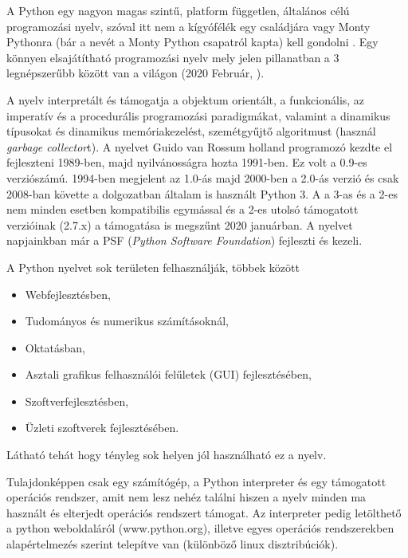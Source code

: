 

A Python egy nagyon magas szintű, platform független, általános célú
programozási nyelv, szóval itt nem a kígyófélék egy családjára vagy Monty
Pythonra (bár a nevét a Monty Python csapatról kapta) kell gondolni \cite{python}.
Egy könnyen elsajátítható programozási nyelv mely jelen pillanatban a 3
legnépszerűbb között van a világon (2020 Február, \cite{tiobe}).

A nyelv interpretált
és támogatja a objektum orientált, a funkcionális, az imperatív és a
procedurális programozási paradigmákat, valamint a dinamikus típusokat
és dinamikus memóriakezelést, szemétgyűjtő algoritmust (használ \emph{garbage collector}t). A
nyelvet Guido van Rossum holland programozó kezdte el fejleszteni
1989-ben, majd nyilvánosságra hozta 1991-ben. Ez volt a 0.9-es
verziószámú. 1994-ben megjelent az 1.0-ás majd 2000-ben a 2.0-ás verzió
és csak 2008-ban követte a dolgozatban általam is használt Python 3. A a
3-as és a 2-es nem minden esetben kompatibilis egymással és a 2-es
utolsó támogatott verzióinak (2.7.x) a támogatása is megszűnt 2020
januárban. A nyelvet napjainkban már a PSF (\emph{Python Software
Foundation}) fejleszti és kezeli.


A Python nyelvet sok területen felhasználják, többek között
\begin{itemize}
\item
  Webfejlesztésben,
\item
  Tudományos és numerikus számításoknál,
\item
  Oktatásban,
\item
  Asztali grafikus felhasználói felűletek (GUI) fejlesztésében,
\item
  Szoftverfejlesztésben,
\item
  Üzleti szoftverek fejlesztésében.
\end{itemize}
Látható tehát hogy tényleg sok helyen jól használható ez a nyelv.


Tulajdonképpen csak egy számítógép, a Python interpreter és egy
támogatott operációs rendszer, amit nem lesz nehéz találni hiszen a
nyelv minden ma használt és elterjedt operációs rendszert támogat. Az
interpreter pedig letölthető a python weboldaláról (www.python.org),
illetve egyes operációs rendszerekben alapértelmezés szerint telepítve
van (különböző linux disztribúciók).

